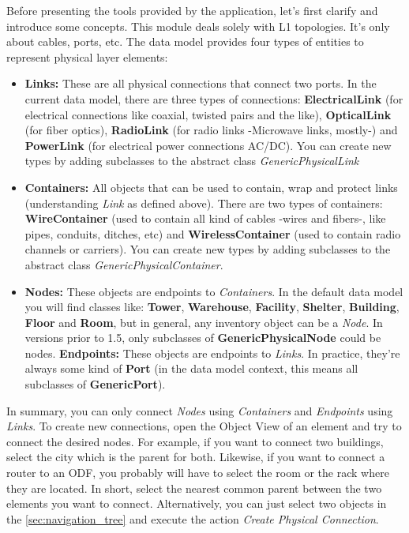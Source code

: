 \documentclass[a4paper]{article}
\begin{document}
		Before presenting the tools provided by the application, let's first clarify and introduce some concepts. This module deals solely with L1 topologies. It's only about cables, ports, etc. The data model provides four types of entities to represent physical layer elements:
		\begin{itemize}
			\item \textbf{Links:} These are all physical connections that connect two ports. In the current data model, there are three	types of connections: \textbf{ElectricalLink} (for electrical connections like coaxial, twisted
			pairs and the like), \textbf{OpticalLink} (for fiber optics), \textbf{RadioLink} (for radio links -Microwave links, mostly-) and \textbf{PowerLink} (for electrical power connections AC/DC). You can create new types by adding subclasses to the abstract class \textit{GenericPhysicalLink}
			\item \textbf{Containers:} All objects that can be used to contain, wrap and protect links (understanding \textit{Link} as defined above). There are two types of containers: \textbf{WireContainer} (used to contain all kind of cables -wires and fibers-, like pipes, conduits, ditches, etc) and \textbf{WirelessContainer} (used to contain radio channels or carriers). You can create new types by adding subclasses to the abstract class \textit{GenericPhysicalContainer}.
			\item \textbf{Nodes:} These objects are endpoints to \textit{Containers}. In the default data model you will find classes like: \textbf{Tower}, \textbf{Warehouse}, \textbf{Facility}, \textbf{Shelter}, \textbf{Building}, \textbf{Floor} and \textbf{Room}, but in general, any inventory object can be a \textit{Node}. In versions prior to 1.5, only subclasses of \textbf{GenericPhysicalNode} could be nodes.
			\textbf{Endpoints:} These objects are endpoints to \textit{Links}. In practice, they're always some kind of \textbf{Port} (in the data model context, this means all subclasses of \textbf{GenericPort}).
		\end{itemize}
		In summary, you can only connect \textit{Nodes} using \textit{Containers} and \textit{Endpoints} using \textit{Links}. To create new connections, open the Object View of an element and try to connect the desired nodes. For example, if you want to connect two buildings, select the city which is the parent for both. Likewise, if you want to connect a router to an ODF, you probably will have to select the room or the rack where they are located. In short, select the nearest common parent between the two elements you want to connect. Alternatively, you can just select two objects in the \ref{sec:navigation_tree} and execute the action \textit{Create Physical Connection}.
		
\end{document}

